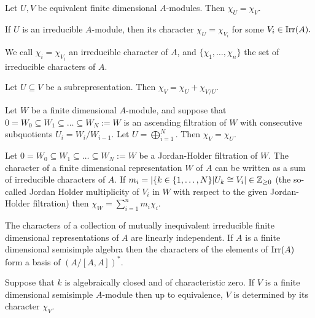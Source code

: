\begin{prop}
Let \(U,V\) be equivalent finite dimensional \(A\)-modules. Then \(\chi _U=\chi _V.\)
\end{prop}

\begin{prop}
If \(U\) is an irreducible \(A\)-module, then its character \(\chi _U=\chi _{V_{i}}\) for some \(V_{i}\in \operatorname{Irr}(A).\)
\end{prop}

\begin{defn}
We call \(\chi _{i}=\chi _{V_{i}}\) an irreducible character of \(A\), and \(\{\chi _{1},\ldots ,\chi _{n}\}\) the set of irreducible characters of \(A\).
\end{defn}

\begin{prop}
Let \(U\subseteq V\) be a subrepresentation. Then \(\chi _V=\chi _U+\chi _{V/U}\).
\end{prop}

\begin{prop}
Let \(W\) be a finite dimensional \(A\)-module, and suppose that \(0=W_{0}\subseteq W_{1}\subseteq \ldots \subseteq W_N:=W\) is an ascending filtration of \(W\) with consecutive subquotients \(U_{i}=W_{i}/W_{i-1}\). Let \(U=\bigoplus_{i=1}^N.\) Then \(\chi _V=\chi _U\).
\end{prop}

\begin{thm}
Let \(0=W_{0}\subseteq W_{1}\subseteq \ldots \subseteq W_N:=W\) be a Jordan-Holder filtration of \(W.\) The character of a finite dimensional representation \(W\) of \(A\) can be written as a sum of irreducible characters of \(A\). If \(m_{i}=|\{k\in \{1,\ldots ,N\}|U_{k}\cong V_{i}|\in \Bbb{Z}_{\geq 0}\) (the so-called Jordan Holder multiplicity of \(V_{i}\) in \(W\) with respect to the given Jordan-Holder filtration) then \(\chi _W=\sum _{i=1}^n m_{i}\chi _{i}\).
\end{thm}

\begin{thm}
The characters of a collection of mutually inequivalent irreducible finite dimensional representations of \(A\) are linearly independent. If \(A\) is a finite dimensional semisimple algebra then the characters of the elements of \(\operatorname{Irr}(A)\) form a basis of \((A/[A,A])^*.\)
\end{thm}

\begin{thm}
Suppose that \(k\) is algebraically closed and of characteristic zero. If \(V\) is a finite dimensional semisimple \(A\)-module then up to equivalence, \(V\) is determined by its character \(\chi _V.\)
\end{thm}

